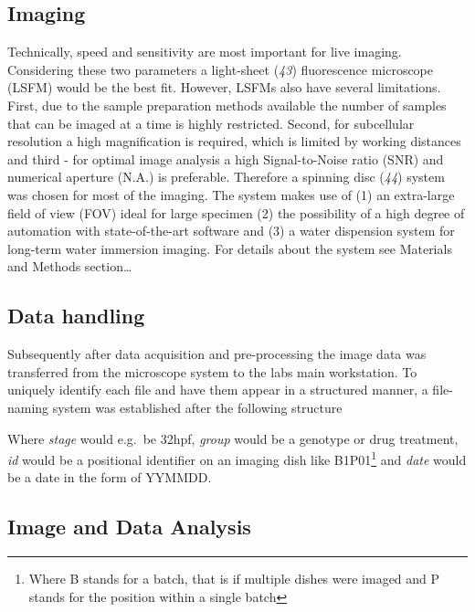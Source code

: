 \documentclass[11pt,singlespacinge,twoside]{reedthesis} %
\begin{document}
\hypertarget{imaging}{%
\subsection{Imaging}\label{imaging}}

Technically, speed and sensitivity are most important for live imaging. Considering these two parameters a light-sheet (\emph{43}) fluorescence microscope (LSFM) would be the best fit. However, LSFMs also have several limitations. First, due to the sample preparation methods available the number of samples that can be imaged at a time is highly restricted. Second, for subcellular resolution a high magnification is required, which is limited by working distances and third - for optimal image analysis a high Signal-to-Noise ratio (SNR) and numerical aperture (N.A.) is preferable. Therefore a spinning disc (\emph{44}) system was chosen for most of the imaging.
The system makes use of (1) an extra-large field of view (FOV) ideal for large specimen (2) the possibility of a high degree of automation with state-of-the-art software and (3) a water dispension system for long-term water immersion imaging. For details about the system see Materials and Methods section\ldots{}

\hypertarget{data-handling}{%
\subsection{Data handling}\label{data-handling}}

Subsequently after data acquisition and pre-processing the image data was transferred from the microscope system to the labs main workstation. To uniquely identify each file and have them appear in a structured manner, a file-naming system was established after the following structure

\makebox[\linewidth]{$[stage]\_[group]\_[id]\_[date]$}
\newline

Where \emph{stage} would e.g.~be 32hpf, \emph{group} would be a genotype or drug treatment, \emph{id} would be a positional identifier on an imaging dish like B1P01\footnote{Where B stands for a batch, that is if multiple dishes were imaged and P stands for the position within a single batch} and \emph{date} would be a date in the form of YYMMDD.

\hypertarget{image-and-data-analysis}{%
\subsection{Image and Data Analysis}\label{image-and-data-analysis}}
\end{document}
